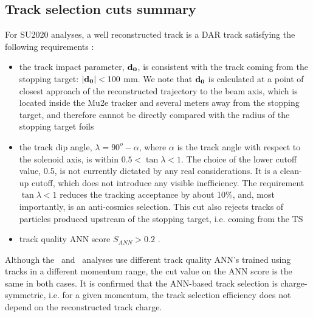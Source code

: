 \subsection{Track selection cuts summary}
\label{sec:track-selection_cuts_summary}
  
For SU2020 analyses, a well reconstructed track is a DAR track satisfying the following requirements {\blue :}

\begin{itemize}
\item
  the track impact parameter, ${\bf d_0}$, is consistent with the track coming from the stopping target: 
  ${\bf |d_0|} < 100$ mm. We note that ${\bf d_0}$ is calculated at a point of closest approach of
  the reconstructed trajectory to the beam axis, which is located inside the Mu2e tracker and 
  several meters away from the stopping target,
  and therefore cannot be directly compared with the radius of the stopping target foils
\item 
  the track dip angle, $\lambda = 90^o - \alpha$, where $\alpha$ is the track angle with respect 
  to the solenoid axis, is within $ 0.5 < \tan{\lambda} < 1$. 
  The choice of the lower cutoff value, 0.5, is not currently dictated by any real considerations.
  It is a clean-up cutoff, which does not introduce any visible inefficiency. 
  The requirement $\tan{\lambda} < 1$ reduces the tracking acceptance by about 10\%, 
  and, most importantly, is an anti-cosmics selection. This cut also rejects tracks of particles 
  produced upstream of the stopping target, i.e. coming from the TS
\item
  track quality ANN score $S_{ANN} > 0.2$ {\blue .}
\end{itemize}

Although the \MuToEm\ and \MuToEp\ analyses use different track quality ANN's trained using tracks
in a different momentum range, the cut value on the ANN score is the same in both cases.
It is confirmed that the ANN-based track selection is charge-symmetric, i.e. for a given momentum,
the track selection efficiency does not depend on the reconstructed track charge.
